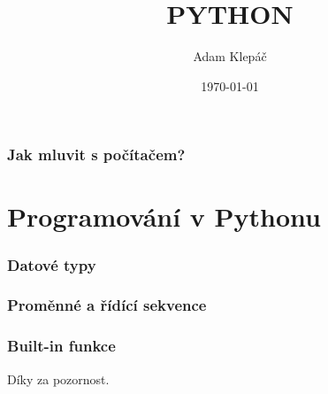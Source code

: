 \documentclass[aspectratio=169,11pt]{beamer}
\title{PYTHON}
\date{\today}
\author{Adam Klepáč}
\institute[GEVO]{Gymnázium Evolution Jižní Město}
\begin{document}
\maketitle

\section[Programovací jazyky]{Jak mluvit s počítačem?}

\begin{frame}[plain]
 \sectionpage
\end{frame}



\part[Programování v Pythonu]{Programování v Pythonu}

\begin{frame}[plain]
 \partpage
\end{frame}

\section[Datové typy]{Datové typy}

\begin{frame}[plain]
 \sectionpage
\end{frame}



\section[Proměnné a řídící sekvence]{Proměnné a řídící sekvence}

\begin{frame}[plain]
 \sectionpage
\end{frame}



\section[Built-in funkce]{Built-in funkce}

\begin{frame}[plain]
 \sectionpage
\end{frame}



\begin{frame}[plain]
 \centering\Huge Díky za pozornost.
\end{frame}
\end{document}
